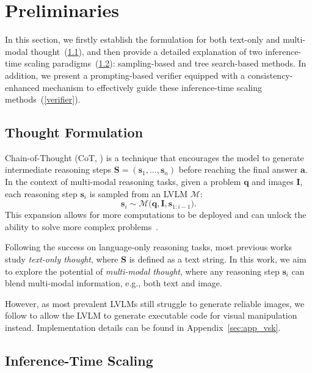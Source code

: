 \section{Preliminaries}

In this section, we firstly establish the formulation for both text-only and multi-modal thought~(\textsection\ref{cot}), and then provide a detailed explanation of two inference-time scaling paradigms~(\textsection\ref{scaling}): sampling-based and tree search-based methods.
In addition, we present a prompting-based verifier equipped with a consistency-enhanced mechanism to effectively guide these inference-time scaling methods~(\textsection\ref{verifier}).

\subsection{Thought Formulation} \label{cot}
Chain-of-Thought (CoT, \citealt{cot}) is a technique that encourages the model to generate intermediate reasoning steps $\mathbf{S}=(\mathbf{s}_1,...,\mathbf{s}_n)$ before reaching the final answer $\mathbf{a}$.
In the context of multi-modal reasoning tasks, given a problem $\mathbf{q}$ and images $\mathbf{I}$, each reasoning step $\mathbf{s}_i$ is sampled from an LVLM $\mathcal{M}$:
\begin{equation}
\label{eq:cot}
    \mathbf{s}_i \sim \mathcal{M}\big(\mathbf{q}, \mathbf{I}, \mathbf{s}_{1:i-1}\big).
\end{equation}
This expansion allows for more computations to be deployed and can unlock the ability to solve more complex problems~\cite{lichain}.

Following the success on language-only reasoning tasks, most previous works~\cite{mcot, ddcot, ccot} study \textit{text-only thought}, where $\mathbf{S}$ is defined as a text string.
In this work, we aim to explore the potential of \textit{multi-modal thought}, where any reasoning step $\mathbf{s}_i$ can blend multi-modal information, e.g., both text and image.

However, as most prevalent LVLMs still struggle to generate reliable images, we follow \citet{vsk} to allow the LVLM to generate executable code for visual manipulation instead.
Implementation details can be found in Appendix~\ref{sec:app_vsk}.




\subsection{Inference-Time Scaling} \label{scaling}

